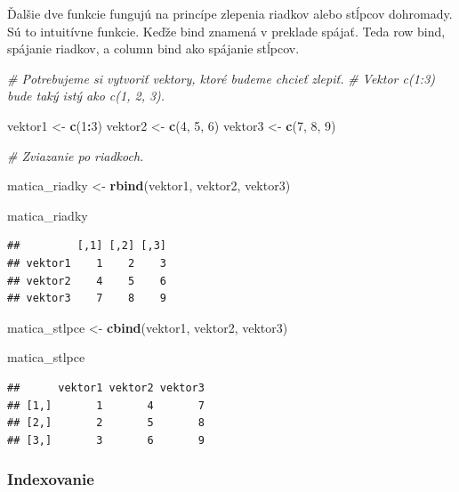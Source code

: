\documentclass[]{article}
\newenvironment{Shaded}{\begin{snugshade}}{\end{snugshade}}
\newcommand{\CommentTok}[1]{\textcolor[rgb]{0.56,0.35,0.01}{\textit{#1}}}
\newcommand{\DecValTok}[1]{\textcolor[rgb]{0.00,0.00,0.81}{#1}}
\newcommand{\KeywordTok}[1]{\textcolor[rgb]{0.13,0.29,0.53}{\textbf{#1}}}
\newcommand{\NormalTok}[1]{#1}
\newcommand{\OperatorTok}[1]{\textcolor[rgb]{0.81,0.36,0.00}{\textbf{#1}}}
\newcommand{\StringTok}[1]{\textcolor[rgb]{0.31,0.60,0.02}{#1}}
\begin{document}
Ďalšie dve funkcie fungujú na princípe zlepenia riadkov alebo stĺpcov
dohromady. Sú to intuitívne funkcie. Keďže bind znamená v preklade
spájať. Teda row bind, spájanie riadkov, a column bind ako spájanie
stĺpcov.

\begin{Shaded}
\begin{Highlighting}[]
\CommentTok{# Potrebujeme si vytvoriť vektory, ktoré budeme chcieť zlepiť.}
\CommentTok{# Vektor c(1:3) bude taký istý ako c(1, 2, 3).}

\NormalTok{vektor1 <-}\StringTok{ }\KeywordTok{c}\NormalTok{(}\DecValTok{1}\OperatorTok{:}\DecValTok{3}\NormalTok{)}
\NormalTok{vektor2 <-}\StringTok{ }\KeywordTok{c}\NormalTok{(}\DecValTok{4}\NormalTok{, }\DecValTok{5}\NormalTok{, }\DecValTok{6}\NormalTok{)}
\NormalTok{vektor3 <-}\StringTok{ }\KeywordTok{c}\NormalTok{(}\DecValTok{7}\NormalTok{, }\DecValTok{8}\NormalTok{, }\DecValTok{9}\NormalTok{)}

\CommentTok{# Zviazanie po riadkoch.}

\NormalTok{matica_riadky <-}\StringTok{ }\KeywordTok{rbind}\NormalTok{(vektor1, vektor2, vektor3)}

\NormalTok{matica_riadky}
\end{Highlighting}
\end{Shaded}

\begin{verbatim}
##         [,1] [,2] [,3]
## vektor1    1    2    3
## vektor2    4    5    6
## vektor3    7    8    9
\end{verbatim}

\begin{Shaded}
\begin{Highlighting}[]
\NormalTok{matica_stlpce <-}\StringTok{ }\KeywordTok{cbind}\NormalTok{(vektor1, vektor2, vektor3)}

\NormalTok{matica_stlpce}
\end{Highlighting}
\end{Shaded}

\begin{verbatim}
##      vektor1 vektor2 vektor3
## [1,]       1       4       7
## [2,]       2       5       8
## [3,]       3       6       9
\end{verbatim}

\hypertarget{indexovanie-1}{%
\subsubsection{Indexovanie}\label{indexovanie-1}}
\end{document}
